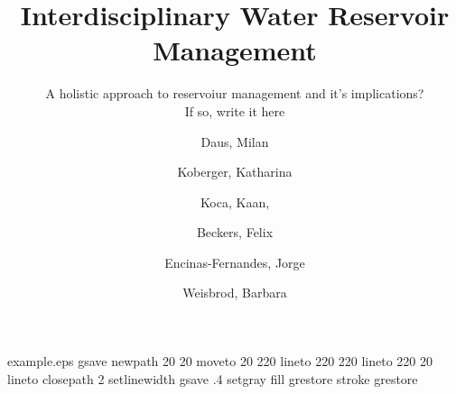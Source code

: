 %
%
%
%
%
\begin{filecontents*}{example.eps}
gsave
newpath
  20 20 moveto
  20 220 lineto
  220 220 lineto
  220 20 lineto
closepath
2 setlinewidth
gsave
  .4 setgray fill
grestore
stroke
grestore
\end{filecontents*}
%
\RequirePackage{fix-cm}
%
\documentclass[smallextended]{svjour3}       %
%
\smartqed  %
%
\usepackage{graphicx}
%
%
%
%
%


\title{Interdisciplinary Water Reservoir Management%
}
\subtitle{A holistic approach to reservoiur management and it's implications?\\ If so, write it here}


\author{Daus, Milan       \and
       Koberger, Katharina\and Koca, Kaan, \and Beckers, Felix \and Encinas-Fernandes, Jorge \and Weisbrod, Barbara
}


